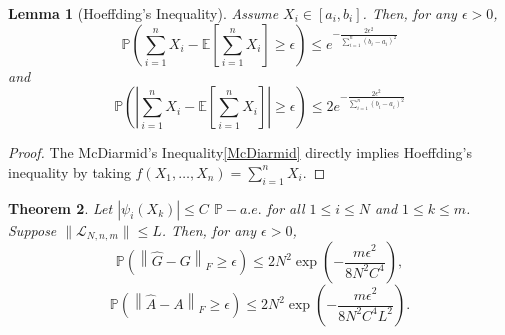 \documentclass{article}[11]
\newtheorem{theorem}{Theorem}
\newtheorem{lemma}[theorem]{Lemma}
\begin{document}
	\begin{lemma}[Hoeffding's Inequality]\label{Hoeffding}
		Assume $X_i \in [a_i, b_i]$. Then, for any $\epsilon>0$,
		\[
		\mathbb{P}\left( \sum_{i=1}^n X_i - \mathbb{E}\left[\sum_{i=1}^n X_i\right] \geq \epsilon \right) \leq e^{-\frac{2\epsilon^2}{\sum_{i=1}^n (b_i - a_i)^2}}
		\]
		and
		\[
		\mathbb{P}\left(\left| \sum_{i=1}^n X_i - \mathbb{E}\left[\sum_{i=1}^n X_i\right]\right| \geq \epsilon \right) \leq 2e^{-\frac{2\epsilon^2}{\sum_{i=1}^n (b_i - a_i)^2}}
		\]
	\end{lemma}
	\begin{proof}
		The McDiarmid's Inequality\eqref{McDiarmid} directly implies Hoeffding's inequality by taking $f(X_1, \ldots, X_n) = \sum_{i=1}^n X_i$.
	\end{proof}
	
	\begin{theorem}\label{Gramian_estimation}
		Let $| \psi_i(X_k) | \leq C$ $\mathbb{P}-a.e.$ for all $ 1 \leq i \leq N$ and $1 \leq k \leq m$. Suppose $\| \mathcal{L}_{N,n,m} \| \leq L$. Then, for any $\epsilon>0$, 
		\[
		\mathbb{P} \left( \left\| \widehat{G} - G \right\|_F \geq \epsilon \right) \leq 2N^2 \exp \left( -\frac{m \epsilon^2}{8 N^2 C^4} \right),
		\]
		\[
		\mathbb{P} \left( \left\| \widehat{A} - A \right\|_F \geq \epsilon \right) \leq 2N^2 \exp \left( -\frac{m\epsilon^2}{8 N^2 C^4 L^2} \right).
		\]
	\end{theorem}
\end{document}
